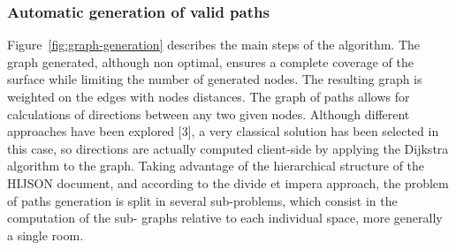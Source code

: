 \documentclass[]{egpubl}
\begin{document}
\subsubsection*{Automatic generation of valid paths}

Figure~\ref{fig:graph-generation} describes the main steps of the algorithm.
The graph generated, although non optimal, ensures a complete coverage of the
surface while limiting the number of generated nodes. The resulting graph is
weighted on the edges with nodes distances. 
The graph of paths allows for calculations of directions between any two given
nodes. Although different approaches have been explored [3], a very classical
solution has been selected in this case, so directions are actually computed
client-side by applying the Dijkstra algorithm to the graph.
Taking advantage of the hierarchical structure of the HIJSON document, and
according to the divide et impera approach, the problem of paths generation is
split in several sub-problems, which consist in the computation of the sub-
graphs relative to each individual space, more generally a single room.
\end{document}
